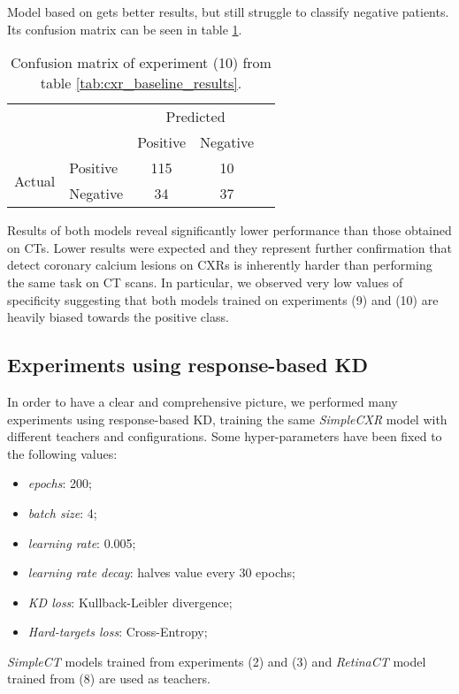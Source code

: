 Model based on \cite{iodice_2022} gets better results, but still struggle to classify negative patients. Its confusion matrix can be seen in table \ref{tab:confusion_matrix_iodice}.

\begin{table}[h]
    \centering
    \begin{tabular}{l|l|c|c|c}
        \multicolumn{2}{c}{}&\multicolumn{2}{c}{Predicted} & \hspace{2.5em} \\
        \cline{3-4}
        \multicolumn{2}{c|}{}& Positive & Negative & \\
        \cline{2-4}
        \multirow{2}{*}{Actual}& Positive & 115 & 10 & \\
        \cline{2-4}
        & Negative & 34 & 37 & \\
        \cline{2-4}
    \end{tabular}
    \caption{Confusion matrix of experiment (10) from table \ref{tab:cxr_baseline_results}.}
    \label{tab:confusion_matrix_iodice}
\end{table}

Results of both models reveal significantly lower performance than those obtained on CTs.
Lower results were expected and they represent further confirmation that detect coronary calcium lesions on CXRs is inherently harder than performing the same task on CT scans.
In particular, we observed very low values of specificity suggesting that both models trained on experiments (9) and (10) are heavily biased towards the positive class.


\subsection{Experiments using response-based KD}\label{sec:experiments_resp_kd}

In order to have a clear and comprehensive picture, we performed many experiments using response-based KD, training the same \emph{SimpleCXR} model with different teachers and configurations.
Some hyper-parameters have been fixed to the following values:
\begin{itemize}
    \item \emph{epochs}: 200;
    \item \emph{batch size}: 4;
    \item \emph{learning rate}: 0.005;
    \item \emph{learning rate decay}: halves value every 30 epochs;
    \item \emph{KD loss}: Kullback-Leibler divergence;
    \item \emph{Hard-targets loss}: Cross-Entropy;
\end{itemize}
\emph{SimpleCT} models trained from experiments (2) and (3) and \emph{RetinaCT} model trained from (8) are used as teachers.

